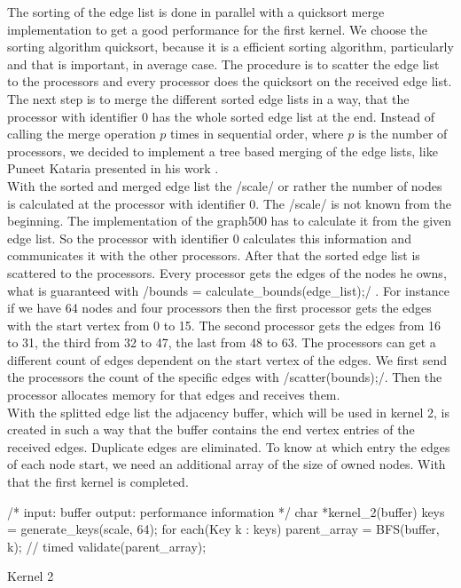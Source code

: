 \documentclass[12pt,a4paper]{article}
\begin{document}
The sorting of the edge list is done in parallel with a quicksort merge implementation to get a good performance for the first kernel. We choose the sorting algorithm quicksort, because it is a efficient sorting algorithm, particularly and that is important, in average case. The procedure is to scatter the edge list to the processors and every processor does the quicksort on the received edge list. The next step is to merge the different sorted edge lists in a way, that the processor with identifier 0 has the whole sorted edge list at the end. Instead of calling the merge operation \(p\) times in sequential order, where \(p\) is the number of processors, we decided to implement a tree based merging of the edge lists, like Puneet Kataria presented in his work \cite{quickmerge}.\\
With the sorted and merged edge list the \cinline/scale/ or rather the number of nodes is calculated at the processor with identifier 0. The \cinline/scale/ is not known from the beginning. The implementation of the graph500 has to calculate it from the given edge list. So the processor with identifier 0 calculates this information and communicates it with the other processors. After that the sorted edge list is scattered to the processors. Every processor gets the edges of the nodes he owns, what is guaranteed with \cinline/bounds = calculate_bounds(edge_list);/ . For instance if we have 64 nodes and four processors then the first processor gets the edges with the start vertex from 0 to 15. The second processor gets the edges from 16 to 31, the third from 32 to 47, the last from 48 to 63. The processors can get a different count of edges dependent on the start vertex of the edges. We first send the processors the count of the specific edges with \cinline/scatter(bounds);/. Then the processor allocates memory for that edges and receives them. \\
With the splitted edge list the adjacency buffer, which will be used in kernel 2, is created in such a way that the buffer contains the end vertex entries of the received edges. Duplicate edges are eliminated. To know at which entry the edges of each node start, we need an additional array of the size of owned nodes. With that the first kernel is completed.\\
\begin{listing}[H]
\begin{ccode}
/*
input: buffer 
output: performance information
*/
char *kernel_2(buffer){
	keys = generate_keys(scale, 64);
	for each(Key k : keys){
		parent_array = BFS(buffer, k); // timed
		validate(parent_array);
	}
}
\end{ccode}
\caption{Kernel 2}
\label{lst:kernel2}
\end{listing}
\end{document}
